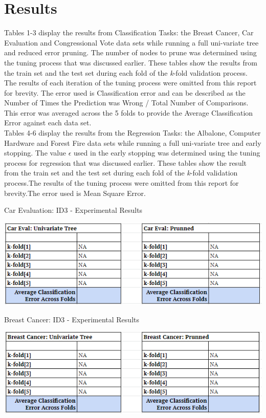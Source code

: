 \documentclass[twoside,11pt]{article}
\begin{document}
\newpage

\section{Results}
Tables 1-3 display the results from Classification Tasks: the Breast Cancer, Car Evaluation and Congressional Vote data sets while running a full uni-variate tree and reduced error pruning. The number of nodes to prune was determined using the tuning process that was discussed earlier. These tables show the results from the train set and the test set during each fold of the \textit{k}-fold validation process. The results of each iteration of the tuning process were omitted from this report for brevity. The error used is Classification error and can be described as the Number of Times the Prediction was Wrong / Total Number of Comparisons. This error was averaged across the 5 folds to provide the Average Classification Error against each data set.\\
Tables 4-6 display the results from the Regression Tasks: the Albalone, Computer Hardware and Forest Fire data sets while running a full uni-variate tree and early stopping. The value $\epsilon$ used in the early stopping was determined using the tuning process for regression that was discussed earlier. These tables show the result from the train set and the test set during each fold of the \textit{k}-fold validation process.The results of the tuning process were omitted from this report for brevity.The error used is  Mean Square Error.\newline

\begin{table}[h]
		\centering
		\caption{Car Evaluation: ID3 - Experimental Results}
		\label{tab:table1}
		\includegraphics[scale=.7]{CarEval_Results}\newline
\end{table}

\begin{table}[h]
		\centering
		\caption{Breast Cancer: ID3 - Experimental Results}
		\label{tab:table2}
		\includegraphics[scale=.7]{BC_Results}\newline
\end{table}
\newpage
\end{document}
